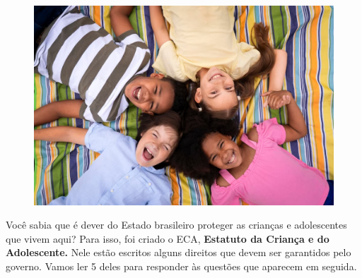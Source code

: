 
\pagebreak

\begin{figure}[htpb!]
\includegraphics[width=\textwidth]{./imgs/img47.png}
\end{figure}

\noindent{}Você sabia que é dever do Estado brasileiro proteger as crianças e
adolescentes que vivem aqui? Para isso, foi criado o ECA,
\textbf{Estatuto da Criança e do Adolescente.} Nele estão escritos
alguns direitos que devem ser garantidos pelo governo. Vamos ler 5
deles para responder às questões que aparecem em seguida.

